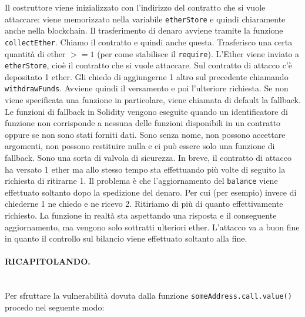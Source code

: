 Il costruttore viene inizializzato con l'indirizzo del contratto che si vuole
attaccare: viene memorizzato nella variabile \verb|etherStore| e quindi
chiaramente anche nella blockchain.
Il trasferimento di denaro avviene tramite la funzione \verb|collectEther|.
Chiamo il contratto e
quindi anche questa. Trasferisco una certa quantità di ether $ >=1$
(per come stabilisce il \verb|require|). L'Ether viene inviato a \verb|etherStore|,
cioè il contratto che si vuole attaccare.
Sul contratto di attacco c'è depositato 1 ether.
Gli chiedo di aggiungerne 1 altro sul precedente chiamando \verb|withdrawFunds|.
Avviene quindi il versamento e poi l'ulteriore
richiesta.
Se non viene specificata una funzione in particolare,
viene chiamata di default la fallback.
Le funzioni di fallback in Solidity vengono eseguite quando un identificatore di
funzione non corrisponde a nessuna delle funzioni disponibili in un contratto
oppure se non sono stati
forniti dati. Sono senza nome, non possono accettare argomenti, non possono
restituire nulla e ci può essere solo una funzione di fallback.
Sono una sorta di valvola di sicurezza.
In breve, il contratto di attacco ha versato 1 ether ma allo stesso tempo sta
effettuando più volte di seguito la richiesta di ritirarne 1.
Il problema è che l'aggiornamento del \verb|balance| viene
effettuato soltanto dopo la spedizione del denaro. Per cui (per esempio) invece
di chiederne 1 ne chiedo e ne ricevo 2.
Ritiriamo di più di quanto effettivamente richiesto.
La funzione in realtà sta aspettando una risposta e il conseguente aggiornamento, ma
vengono solo sottratti ulteriori ether. L'attacco va a buon fine in quanto il controllo sul
bilancio viene effettuato soltanto alla fine.

\paragraph{RICAPITOLANDO.}\ \\
Per sfruttare la vulnerabilità dovuta dalla funzione \verb|someAddress.call.value()|
procedo nel seguente modo:

